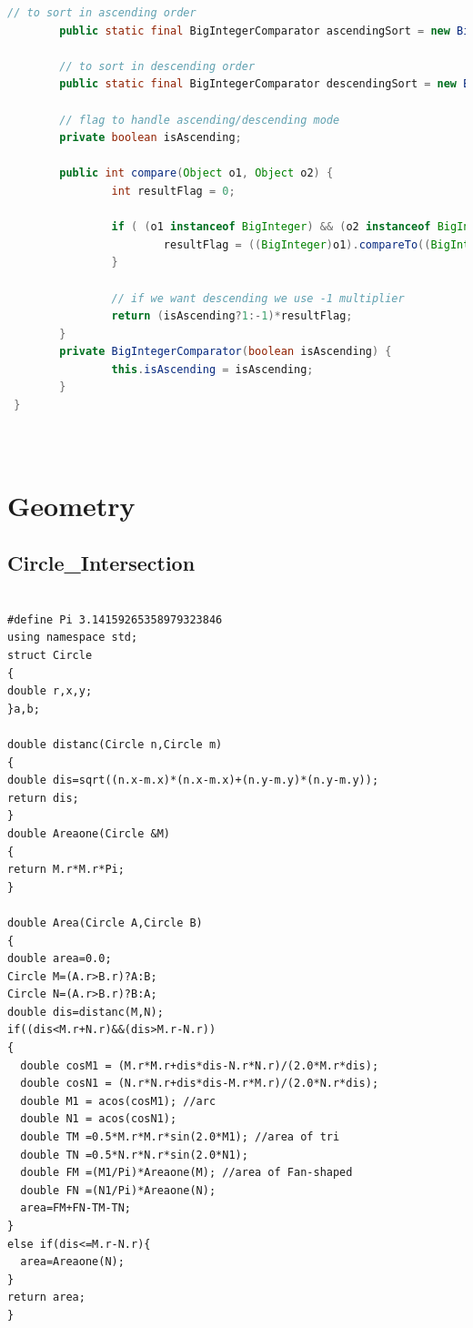 \documentclass[twocolumn]{article}
\begin{document}
\begin{twocolumn}
\begin{lstlisting}[language={Java}]
        // to sort in ascending order
        public static final BigIntegerComparator ascendingSort = new BigIntegerComparator(true);

        // to sort in descending order
        public static final BigIntegerComparator descendingSort = new BigIntegerComparator(false);

        // flag to handle ascending/descending mode
        private boolean isAscending;

        public int compare(Object o1, Object o2) {
                int resultFlag = 0;

                if ( (o1 instanceof BigInteger) && (o2 instanceof BigInteger)) {
                        resultFlag = ((BigInteger)o1).compareTo((BigInteger)o2);
                }

                // if we want descending we use -1 multiplier
                return (isAscending?1:-1)*resultFlag;
        }
        private BigIntegerComparator(boolean isAscending) {
                this.isAscending = isAscending;
        }
 }
\end{lstlisting}
\begin{lstlisting}[language={[ANSI]C}]
\end{lstlisting}
\begin{lstlisting}[language={[ANSI]C}]
\end{lstlisting}
\begin{lstlisting}[language={[ANSI]C}]
\end{lstlisting}

\newpage
\section{Geometry}

\subsection{Circle\_Intersection}
\begin{lstlisting}[language={[ANSI]C}]

#define Pi 3.14159265358979323846
using namespace std;
struct Circle
{
double r,x,y;
}a,b;

double distanc(Circle n,Circle m)
{
double dis=sqrt((n.x-m.x)*(n.x-m.x)+(n.y-m.y)*(n.y-m.y));
return dis;
}
double Areaone(Circle &M)
{
return M.r*M.r*Pi;
}

double Area(Circle A,Circle B)
{
double area=0.0;
Circle M=(A.r>B.r)?A:B;
Circle N=(A.r>B.r)?B:A;
double dis=distanc(M,N);
if((dis<M.r+N.r)&&(dis>M.r-N.r))
{
  double cosM1 = (M.r*M.r+dis*dis-N.r*N.r)/(2.0*M.r*dis);
  double cosN1 = (N.r*N.r+dis*dis-M.r*M.r)/(2.0*N.r*dis);
  double M1 = acos(cosM1); //arc
  double N1 = acos(cosN1);
  double TM =0.5*M.r*M.r*sin(2.0*M1); //area of tri
  double TN =0.5*N.r*N.r*sin(2.0*N1);
  double FM =(M1/Pi)*Areaone(M); //area of Fan-shaped
  double FN =(N1/Pi)*Areaone(N);
  area=FM+FN-TM-TN;
}
else if(dis<=M.r-N.r){
  area=Areaone(N);
}
return area;
}
\end{lstlisting}


\end{twocolumn}
\end{document}
